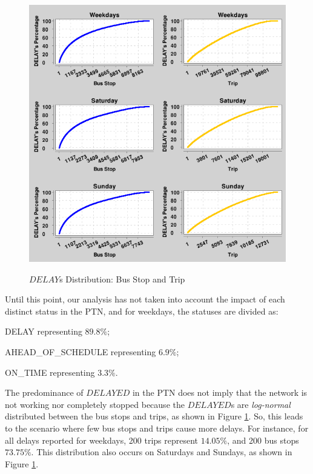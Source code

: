 \begin{figure}[h!]
     \centering
        \caption{$DELAY$s Distribution: Bus Stop and Trip}
        \includegraphics[scale=.45]{imagem/cap5/trips_delays_per_bus_stops.png}
        \label{img:5:DelayDistribution}
\end{figure}

Until this point, our analysis has not taken into account the impact of each distinct status in the PTN, and for weekdays, the statuses are divided as:
\begin{enumerate*}
    \item DELAY representing $89.8\%$;
    \item AHEAD\_OF\_SCHEDULE representing $6.9\%$;
    \item ON\_TIME representing $3.3\%$.
\end{enumerate*}
The predominance of $DELAYED$ in the PTN does not imply that the network is not working 
nor completely stopped because the $DELAYED$s are {\em log-normal} distributed between the bus stops and trips, as shown in Figure \ref{img:5:DelayDistribution}.
So, this leads to the scenario where few bus stops and trips cause more delays. 
For instance, for all delays reported for weekdays, 200 trips represent $14.05\%$, and 200 bus stops $73.75\%$. This distribution also occurs on Saturdays and Sundays, as shown in Figure \ref{img:5:DelayDistribution}.



